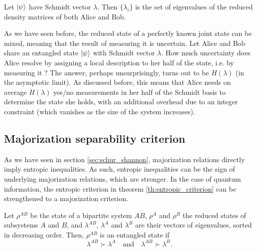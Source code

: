 \begin{corollary} \label{cor:reduced_schmidt} %
    Let $\ket{\psi}$ have Schmidt vector $\lambda$. Then $\{\lambda_i\}$ is the set of eigenvalues of the reduced density matrices of both Alice and Bob.
\end{corollary}

As we have seen before, the reduced state of a perfectly known joint state can be mixed, meaning that the result of measuring it is uncertain. Let Alice and Bob share an entangled state $\ket{\psi}$ with Schmidt vector $\lambda$. How much uncertainty does Alice resolve by assigning a local description to her half of the state, i.e. by measuring it ? The answer, perhaps unsurprisingly, turns out to be $H(\lambda)$ (in the asymptotic limit). As discussed before, this means that Alice needs on average $H(\lambda)$ yes/no measurements in her half of the Schmidt basis to determine the state she holds, with an additional overhead due to an integer constraint (which vanishes as the size of the system increases).

\subsection{Majorization separability criterion} \label{sec:majorization_separability_criterion}

As we have seen in section \ref{sec:schur_shannon}, majorization relations directly imply entropic inequalities. As such, entropic inequalities can be the sign of underlying majorization relations, which are stronger. In the case of quantum information, the entropic criterion in theorem \ref{th:entropic_criterion} can be strengthened to a majorization criterion.

\begin{theorem} \label{th:majorization_separability_criterion}
    Let $\rho^{AB}$ be the state of a bipartite system $AB$, $\rho^A$ and $\rho^B$ the reduced states of subsystems $A$ and $B$, and $\lambda^{AB}$, $\lambda^A$ and $\lambda^B$ are their vectors of eigenvalues, sorted in decreasing order. Then, $\rho^{AB}$ is an entangled state if 
    \begin{equation}
        \lambda^{AB} \succ \lambda^A \quad \text{and} \quad \lambda^{AB} \succ \lambda^B.
    \end{equation}
\end{theorem}

